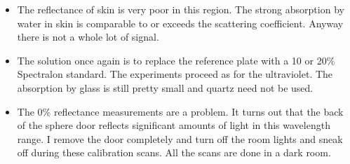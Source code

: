 \documentclass{article}
\begin{document}
\begin{itemize}
\item
The reflectance of skin is very poor in this region.  The strong
absorption by water in skin is comparable to or exceeds the scattering
coefficient.  Anyway there is not a whole lot of signal.

\item
The solution once again is to replace the reference plate with a 
10 or 20\% Spectralon standard.  The experiments proceed as for the
ultraviolet.  The absorption by glass is still pretty small and
quartz need not be used.

\item
The 0\% reflectance measurements are a problem.  It turns out that the back
of the sphere door reflects significant amounts of light in this wavelength
range.  I remove the door completely and turn off the room lights and 
sneak off during these calibration scans.  All the scans are done in a 
dark room.  

\end{itemize}

\clearpage



\end{document}
